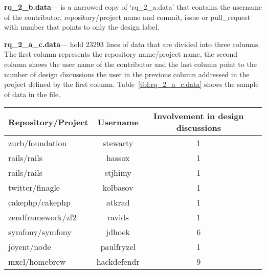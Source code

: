 \noindent\textbf{rq\_2\_b.data}--- is a narrowed copy of `rq\_2\_a.data' that contains the username of the contributor, repository/project name and commit, issue or pull\_request with number that points to only the design label.

\noindent\textbf{rq\_2\_a\_c.data}--- hold 23293 lines of data that are divided into three columns. The first column represents the repository name/project name, the second column shows the user name of the contributor and the last column point to the number of design discussions the user in the previous column addressed in the project defined by the first column. Table~\ref{tbl:rq_2_a_c.data} shows the sample of data in the file.  
\begin{table*}
	\centering
	\caption{Data sample in rq\_2\_a\_c.data}
	\label{tbl:rq_2_a_c.data}
	\begin{tabular}{lccc} 
		\toprule
		\textbf{Repository/Project} & \textbf{Username} & \textbf{Involvement in design discussions}   \\
		\midrule
		zurb/foundation & stewarty & 1 \\
		rails/rails & hassox & 1 \\
		rails/rails & stjhimy & 1 \\
		twitter/finagle & kolbasov & 1 \\
		cakephp/cakephp & atkrad & 1 \\
		zendframework/zf2 & ravids & 1 \\
		symfony/symfony & jdhoek & 6 \\
		joyent/node & paulfryzel & 1 \\
		mxcl/homebrew & hackdefendr & 9 \\
		\bottomrule
	\end{tabular}
\end{table*}

   